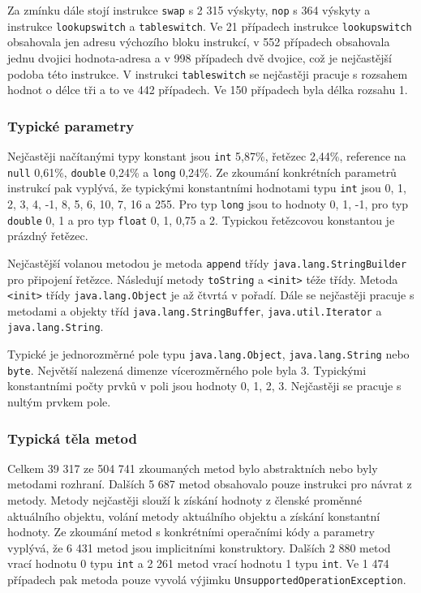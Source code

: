 Za zmínku dále stojí instrukce \texttt{swap} s 2 315 výskyty, \texttt{nop} s 364 výskyty a instrukce \texttt{lookupswitch} a \texttt{tableswitch}. Ve 21 případech instrukce \texttt{lookupswitch} obsahovala jen adresu výchozího bloku instrukcí, v 552 případech obsahovala jednu dvojici hodnota-adresa a v 998 případech dvě dvojice, což je nejčastější podoba této instrukce. V instrukci \texttt{tableswitch} se nejčastěji pracuje s rozsahem hodnot o délce tři a to ve 442 případech. Ve 150 případech byla délka rozsahu 1.

\subsubsection{Typické parametry}

Nejčastěji načítanými typy konstant jsou \texttt{int} 5,87\%, řetězec 2,44\%, reference na \texttt{null} 0,61\%, \texttt{double} 0,24\% a \texttt{long} 0,24\%.
Ze zkoumání konkrétních parametrů instrukcí pak vyplývá, že typickými konstantními hodnotami typu \texttt{int} jsou 0, 1, 2, 3, 4, -1, 8, 5, 6, 10, 7, 16 a 255. Pro typ \texttt{long} jsou to hodnoty 0, 1, -1, pro typ \texttt{double} 0, 1 a pro typ \texttt{float} 0, 1, 0,75 a 2. Typickou řetězcovou konstantou je prázdný řetězec. 

Nejčastější volanou metodou je metoda \texttt{append} třídy \texttt{java.lang.StringBuilder} pro připojení řetězce. Následují metody \texttt{toString} a \texttt{<init>} téže třídy. Metoda \texttt{<init>} třídy \texttt{java.lang.Object} je až čtvrtá v pořadí. Dále se nejčastěji pracuje s metodami a objekty tříd \texttt{java.lang.StringBuffer}, \texttt{java.util.Iterator} a \texttt{java.lang.String}.

Typické je jednorozměrné pole typu \texttt{java.lang.Object}, \texttt{java.lang.String} nebo \texttt{byte}. Největší nalezená dimenze vícerozměrného pole byla 3. Typickými konstantními počty prvků v poli jsou hodnoty 0, 1, 2, 3. Nejčastěji se pracuje s nultým prvkem pole.

\subsubsection{Typická těla metod}

Celkem 39 317 ze 504 741 zkoumaných metod bylo abstraktních nebo byly metodami rozhraní. Dalších 5 687 metod obsahovalo pouze instrukci pro návrat z metody. Metody nejčastěji slouží k získání hodnoty z členské proměnné aktuálního objektu, volání metody aktuálního objektu a získání konstantní hodnoty. Ze zkoumání metod s konkrétními operačními kódy a parametry vyplývá, že 6 431 metod jsou implicitními konstruktory. Dalších 2 880 metod vrací hodnotu 0 typu \texttt{int} a 2 261 metod vrací hodnotu 1 typu \texttt{int}. Ve 1 474 případech pak metoda pouze vyvolá výjimku \texttt{UnsupportedOperationException}.


